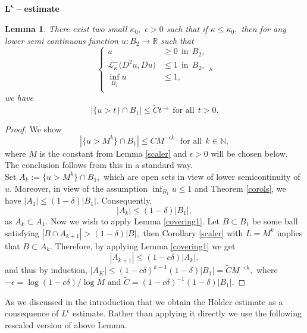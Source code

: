 \documentclass{amsart}
\theoremstyle{plain}
\newtheorem{lemma}[theorem]{Lemma}
\numberwithin{equation}{section}
\begin{document}
\subsection{}\textbf{$\bm{L^{\epsilon}-}$estimate}
\begin{lemma}\label{lepaa}
There exist two small $\kappa_{0},$ $\epsilon>0$ such that if $\kappa\leq \kappa_{0},$ then for any lower semi continuous function $u: B_{2}\longrightarrow\mathbb{R}$ such that
\begin{equation}\label{lepsilon}
\left\{
\begin{aligned}
u&\geq0~~\text{in}~~B_{2},\\
\mathcal{L}_{\kappa}^{-}\big(D^{2}u,Du\big)&\leq 1~~\text{in}~~B_{2},\\ 
\inf_{B_{1}}u&\leq 1,\\
\end{aligned}
\right.
s\end{equation}
we have 
\[|\{u>t\}\cap B_{1}|\leq \tilde{C}t^{-\epsilon}~~\text{for~all}~~t>0.\]
\end{lemma}
\begin{proof}
We show 
\[|\{u>M^{k}\}\cap B_{1}|\leq C M^{-\epsilon k}~~~\text{for~all}~~k\in \mathbb{N},\]
where $M$ is the constant from Lemma \ref{scaler} and $\epsilon>0$ will be chosen below. The conclusion follows from this in a standard way.\\
Set $A_{k}:=\{u>M^{k}\}\cap B_{1},$ which are open sets in view of lower semicontinuity of $u.$ Moreover, in view of the assumption $\inf_{B_{1}}u\leq 1$ and Theorem \ref{corols}, we have $|A_{1}|\leq (1-\delta)|B_{1}|.$ Consequently, 
\[|A_{k}|\leq (1-\delta)|B_{1}|,\]
as $A_{k}\subset A_{1}.$ Now we wish to apply Lemma \ref{covering1}. Let $B\subset B_{1}$ be some ball satisfying $|B\cap A_{k+1}|>(1-\delta)|B|,$ then Corollary \ref{scaler} with $L=M^{k}$ implies that $B\subset A_{k}.$ Therefore, by applying Lemma \ref{covering1} we get 
\begin{equation}
|A_{k+1}|\leq (1-c\delta)|A_{k}|,
\end{equation}
and thus by induction, $|A_{K}|\leq (1-c\delta)^{k-1}(1-\delta)|B_{1}|=\tilde{C}M^{-\epsilon k},$ where $-\epsilon=\log(1-c\delta)/\log M$ and $\tilde{C}=(1-c\delta)^{-1}(1-\delta)|B_{1}|.$
\end{proof}
As we discussed in the introduction that we obtain the H\"{o}lder estimate as a consequence of $L^{\epsilon}$ estimate. Rather than applying it directly we use the following rescaled version of above Lemma.
\end{document}
